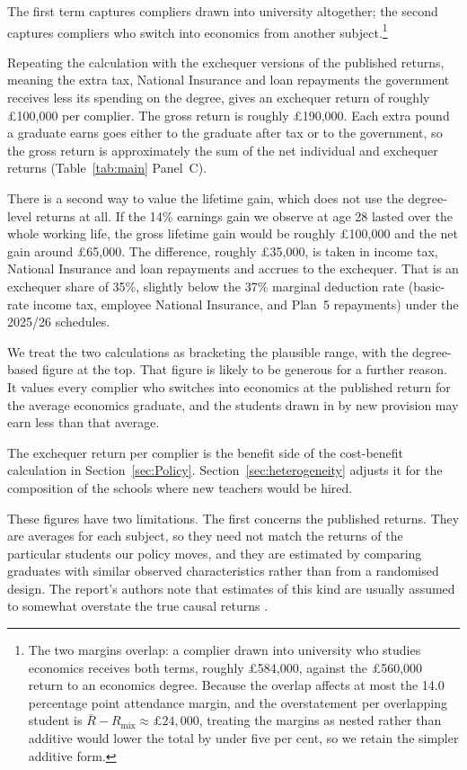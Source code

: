 The first term captures compliers drawn into university altogether; the second captures compliers who switch into economics from another subject.\footnote{The two margins overlap: a complier drawn into university who studies economics receives both terms, roughly \pounds 584,000, against the \pounds 560,000 return to an economics degree. Because the overlap affects at most the 14.0 percentage point attendance margin, and the overstatement per overlapping student is $\bar{R} - R_{\text{mix}} \approx \pounds 24{,}000$, treating the margins as nested rather than additive would lower the total by under five per cent, so we retain the simpler additive form.}

Repeating the calculation with the exchequer versions of the published returns, meaning the extra tax, National Insurance and loan repayments the government receives less its spending on the degree, gives an exchequer return of roughly \pounds 100,000 per complier. The gross return is roughly \pounds 190,000. Each extra pound a graduate earns goes either to the graduate after tax or to the government, so the gross return is approximately the sum of the net individual and exchequer returns (Table~\ref{tab:main} Panel~C).

There is a second way to value the lifetime gain, which does not use the degree-level returns at all. If the 14\% earnings gain we observe at age 28 lasted over the whole working life, the gross lifetime gain would be roughly \pounds 100,000 and the net gain around \pounds 65,000. The difference, roughly \pounds 35,000, is taken in income tax, National Insurance and loan repayments and accrues to the exchequer. That is an exchequer share of 35\%, slightly below the 37\% marginal deduction rate (basic-rate income tax, employee National Insurance, and Plan~5 repayments) under the 2025/26 schedules.

We treat the two calculations as bracketing the plausible range, with the degree-based figure at the top. That figure is likely to be generous for a further reason. It values every complier who switches into economics at the published return for the average economics graduate, and the students drawn in by new provision may earn less than that average.

The exchequer return per complier is the benefit side of the cost-benefit calculation in Section~\ref{sec:Policy}. Section~\ref{sec:heterogeneity} adjusts it for the composition of the schools where new teachers would be hired.

These figures have two limitations. The first concerns the published returns. They are averages for each subject, so they need not match the returns of the particular students our policy moves, and they are estimated by comparing graduates with similar observed characteristics rather than from a randomised design. The report's authors note that estimates of this kind are usually assumed to somewhat overstate the true causal returns \citep{britton2026lifetime}.

